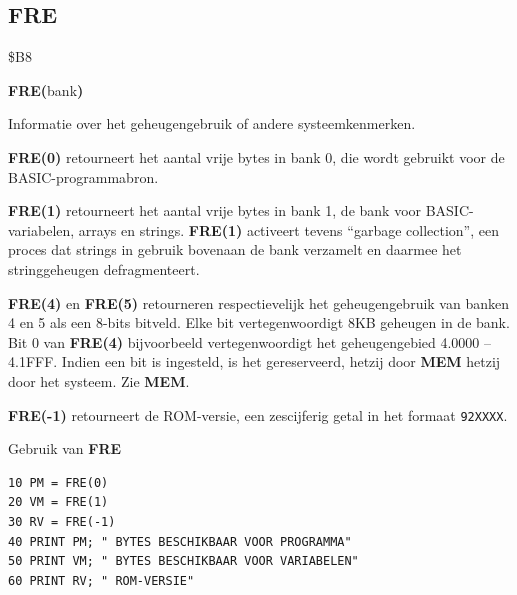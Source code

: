 
\newpage
\subsection{FRE}
\begin{description}[leftmargin=2cm,style=nextline]
\item [Token:]    \$B8
\item [Formaat:]   {\bf FRE(}bank{\bf)}\item [Retourneert:]  Informatie over het geheugengebruik of andere systeemkenmerken.

                  {\bf FRE(0)} retourneert het aantal vrije bytes in bank 0, die wordt gebruikt voor de BASIC-programmabron.

                  {\bf FRE(1)} retourneert het aantal vrije bytes in bank 1, de bank voor BASIC-variabelen, arrays en strings. {\bf FRE(1)} activeert tevens ``garbage collection'', een proces dat strings in gebruik bovenaan de bank verzamelt en daarmee het stringgeheugen defragmenteert.

                  {\bf FRE(4)} en {\bf FRE(5)} retourneren respectievelijk het geheugengebruik van banken 4 en 5 als een 8-bits bitveld. Elke bit vertegenwoordigt 8KB geheugen in de bank. Bit 0 van {\bf FRE(4)} bijvoorbeeld vertegenwoordigt het geheugengebied 4.0000 -- 4.1FFF. Indien een bit is ingesteld, is het gereserveerd, hetzij door {\bf MEM} hetzij door het systeem. Zie {\bf MEM}.

                  {\bf FRE(-1)} retourneert de ROM-versie, een zescijferig getal in het formaat \texttt{92XXXX}.

\item [Voorbeeld:]  Gebruik van {\bf FRE}

\begin{tcolorbox}[colback=black,coltext=white]
\verbatimfont{\codefont}
\begin{verbatim}
10 PM = FRE(0)
20 VM = FRE(1)
30 RV = FRE(-1)
40 PRINT PM; " BYTES BESCHIKBAAR VOOR PROGRAMMA"
50 PRINT VM; " BYTES BESCHIKBAAR VOOR VARIABELEN"
60 PRINT RV; " ROM-VERSIE"
\end{verbatim}
\end{tcolorbox}
\end{description}


\newpage
